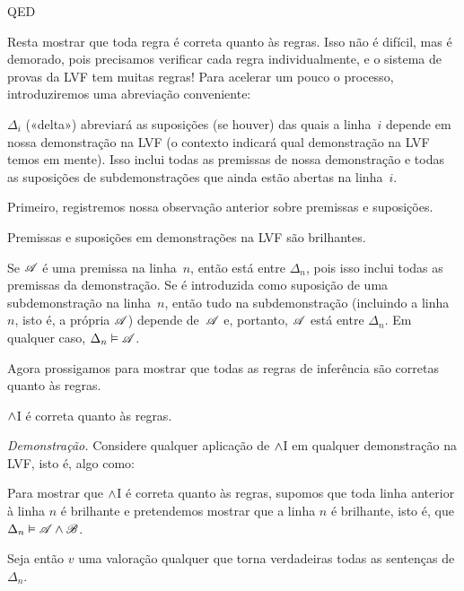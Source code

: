 QED

Resta mostrar que toda regra é correta quanto às regras. Isso não é difícil, mas é demorado, pois precisamos verificar cada regra individualmente, e o sistema de provas da LVF tem muitas regras! Para acelerar um pouco o processo, introduziremos uma abreviação conveniente:



$\Delta_i$ («delta») abreviará as suposições (se houver) das quais a linha~$i$ depende em nossa demonstração na LVF (o contexto indicará qual demonstração na LVF temos em mente). Isso inclui todas as premissas de nossa demonstração e todas as suposições de subdemonstrações que ainda estão abertas na linha~$i$.



Primeiro, registremos nossa observação anterior sobre premissas e suposições.

\begin{factoidboxe}
	Premissas e suposições em demonstrações na LVF são brilhantes.
\end{factoidboxe}

Se $\mathscr{A}$ é uma premissa na linha~$n$, então está entre $\Delta_n$, pois isso inclui todas as premissas da demonstração. Se é introduzida como suposição de uma subdemonstração na linha~$n$, então tudo na subdemonstração (incluindo a linha~$n$, isto é, a própria $\mathscr{A}$) depende de~$\mathscr{A}$ e, portanto, $\mathscr{A}$ está entre $\Delta_n$. Em qualquer caso, $\Delta_n \vDash \mathscr{A}$.






Agora prossigamos para mostrar que todas as regras de inferência são corretas quanto às regras.

\begin{factoidboxe}$\wedge$I é correta quanto às regras.
\end{factoidboxe}

\emph{Demonstração.} Considere qualquer aplicação de $\wedge$I em qualquer demonstração na LVF, isto é, algo como:
\begin{fitchproof}
	 
\end{fitchproof}\noindent
Para mostrar que $\wedge$I é correta quanto às regras, supomos que toda linha anterior à linha $n$ é brilhante e pretendemos mostrar que a linha $n$ é brilhante, isto é, que $\Delta_n \vDash \mathscr{A} \wedge \mathscr{B}$.

Seja então $v$ uma valoração qualquer que torna verdadeiras todas as sentenças de $\Delta_n$.

